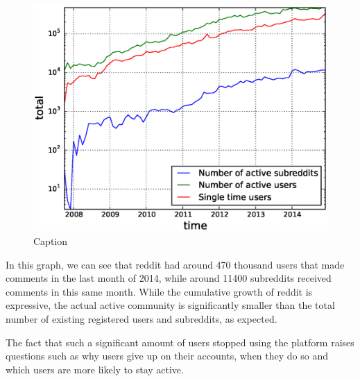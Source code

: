 \begin{figure}[!tb]
\centering
\includegraphics[scale=0.4]{./images/active_users_subreddits.eps}
\caption{Caption}
\label{fig:active_users_subreddits}
\end{figure}

In this graph, we can see that reddit had around 470 thousand users that made comments in the last month of 2014, while around 11400 subreddits received comments in this same month. While the cumulative growth of reddit is expressive, the actual active community is significantly smaller than the total number of existing registered users and subreddits, as expected.

The fact that such a significant amount of users stopped using the platform raises questions such as why users give up on their accounts, when they do so and which users are more likely to stay active. 
